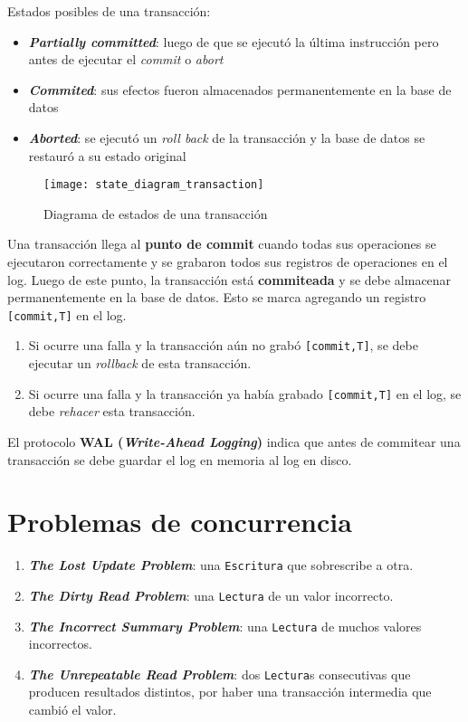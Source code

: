 \documentclass[a4paper, twoside]{article}
\begin{document}
Estados posibles de una transacción:
\begin{itemize}
	\item \textbf{\emph{Partially committed}}: luego de que se ejecutó la última instrucción pero antes de ejecutar el \emph{commit} o \emph{abort}
	\item \textbf{\emph{Commited}}: sus efectos fueron almacenados permanentemente en la base de datos
	\item \textbf{\emph{Aborted}}: se ejecutó un \emph{roll back} de la transacción y la base de datos se restauró a su estado original
\end{itemize}

\begin{figure}[H]
	\centering
	\texttt{[image: state\_diagram\_transaction]}
	\caption{Diagrama de estados de una transacción}
\end{figure}

Una transacción llega al \textbf{punto de commit} cuando todas sus operaciones se ejecutaron correctamente y se grabaron todos sus registros de operaciones en el log. Luego de este punto, la transacción está \textbf{commiteada} y se debe almacenar permanentemente en la base de datos. Esto se marca agregando un registro \texttt{[commit,T]} en el log.
\begin{enumerate}
	\item Si ocurre una falla y la transacción aún no grabó \texttt{[commit,T]}, se debe ejecutar un \emph{rollback} de esta transacción.
	\item Si ocurre una falla y la transacción ya había grabado \texttt{[commit,T]} en el log, se debe \emph{rehacer} esta transacción.
\end{enumerate}

El protocolo \textbf{WAL (\emph{Write-Ahead Logging})} indica que antes de commitear una transacción se debe guardar el log en memoria al log en disco.

\section{Problemas de concurrencia}
\begin{enumerate}
	\item \textbf{\emph{The Lost Update Problem}}: una \texttt{Escritura} que sobrescribe a otra.
	\item \textbf{\emph{The Dirty Read Problem}}: una \texttt{Lectura} de un valor incorrecto.
	\item \textbf{\emph{The Incorrect Summary Problem}}: una \texttt{Lectura} de muchos valores incorrectos.
	\item \textbf{\emph{The Unrepeatable Read Problem}}: dos \texttt{Lectura}s consecutivas que producen resultados distintos, por haber una transacción intermedia que cambió el valor.
\end{enumerate}
\end{document}
